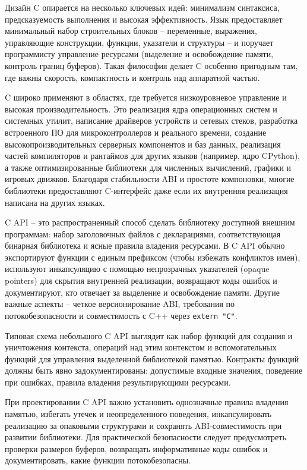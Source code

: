 Дизайн C опирается на несколько ключевых идей: минимализм синтаксиса, предсказуемость выполнения и высокая эффективность. Язык предоставляет минимальный набор строительных блоков -- переменные, выражения, управляющие конструкции, функции, указатели и структуры -- и поручает программисту управление ресурсами (выделение и освобождение памяти, контроль границ буферов). Такая философия делает C особенно пригодным там, где важны скорость, компактность и контроль над аппаратной частью.

C широко применяют в областях, где требуется низкоуровневое управление и высокая производительность. Это реализация ядра операционных систем и системных утилит, написание драйверов устройств и сетевых стеков, разработка встроенного ПО для микроконтроллеров и реального времени, создание высокопроизводительных серверных компонентов и баз данных, реализация частей компиляторов и рантаймов для других языков (например, ядро CPython), а также оптимизированные библиотеки для численных вычислений, графики и игровых движков. Благодаря стабильности ABI и простоте компоновки, многие библиотеки предоставляют C-интерфейс даже если их внутренняя реализация написана на других языках.

C API -- это распространенный способ сделать библиотеку доступной внешним программам: набор заголовочных файлов с декларациями, соответствующая бинарная библиотека и ясные правила владения ресурсами. В C API обычно экспортируют функции с единым префиксом (чтобы избежать конфликтов имен), используют инкапсуляцию с помощью непрозрачных указателей (opaque pointers) для скрытия внутренней реализации, возвращают коды ошибок и документируют, кто отвечает за выделение и освобождение памяти. Другие важные аспекты -- четкое версионирование ABI, требования по потокобезопасности и совместимость с C++ через \verb`extern "C"`.

Типовая схема небольшого C API выглядит как набор функций для создания и уничтожения контекста, операций над этим контекстом и вспомогательных функций для управления выделенной библиотекой памятью. Контракты функций должны быть явно задокументированы: допустимые входные значения, поведение при ошибках, правила владения результирующими ресурсами.

При проектировании C API важно установить однозначные правила владения памятью, избегать утечек и неопределенного поведения, инкапсулировать реализацию за опаковыми структурами и сохранять ABI-совместимость при развитии библиотеки. Для практической безопасности следует предусмотреть проверки размеров буферов, возвращать информативные коды ошибок и документировать, какие функции потокобезопасны.


